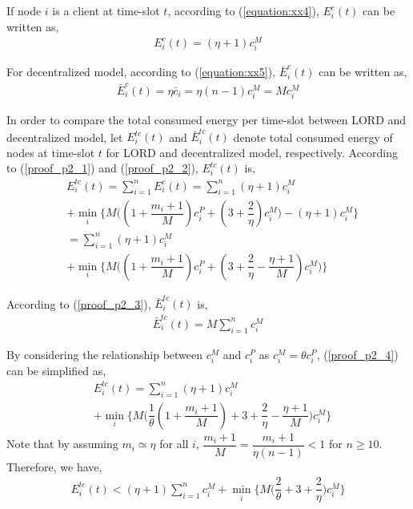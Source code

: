 \documentclass[journal,12pt, onecolumn]{IEEEtran}
\begin{document}
If node $i$ is a client at time-slot $t$, according to (\ref{equation:xx4}), $E_i^c(t)$ can be written as,
\begin{align}
\label{proof_p2_2}
 E_i^c(t)= (\eta +1)c_i^M
 \end{align}
 
For decentralized model, according to (\ref{equation:xx5}), $\bar{E}_i^c(t)$ can be written as,
\begin{align}
\label{proof_p2_3}
\bar{E}_i^c(t)= \eta\bar{c}_i = \eta (n-1)c_i^M = M c_i^M
 \end{align}
 
In order to compare the total consumed energy per time-slot between LORD and decentralized model, let $E_i^{tc}(t)$ and $\bar{E}_i^{tc}(t)$ denote total consumed energy of nodes at time-slot $t$ for LORD and decentralized model, respectively. According to (\ref{proof_p2_1}) and (\ref{proof_p2_2}), $E_i^{tc}(t)$ is,
\begin{align}
\label{proof_p2_4}
 &E_i^{tc}(t)= \sum_{i=1}^n E_i^c (t) = \sum_{i=1}^n (\eta +1)c_i^M \nonumber
 \\
 & + 
 \min_i \Big\{   M \Big( (1 + \dfrac{m_i +1}{M})c_i ^{P} + (3+\dfrac{2}{\eta})c_i ^{M}  \Big)  - (\eta +1)c_i^M \Big\}
 \nonumber \\
 & = 
 \sum_{i=1}^n (\eta +1)c_i^M 
 \nonumber \\
& + 
 \min_i \Big\{   M \Big( (1 + \dfrac{m_i +1}{M})c_i ^{P} + (3+\dfrac{2}{\eta} - \dfrac{\eta +1}{M})c_i ^{M}  \Big) \Big\} 
 \end{align}

According to (\ref{proof_p2_3}), $\bar{E}_i^{tc}(t)$ is, 
\begin{align}
\label{proof_p2_5}
\bar{E}_i^{tc}(t)= M \sum_{i=1}^n c_i^M
 \end{align}

By considering the relationship between $c_i^M$ and $c_i^P$ as $c_i^M = \theta c_i^P$, (\ref{proof_p2_4}) can be simplified as, 
 \begin{align}
\label{proof_p2_6}
 &E_i^{tc}(t)= 
 \sum_{i=1}^n (\eta +1)c_i^M 
 \nonumber \\
& + 
 \min_i \Big\{   M \Big( \dfrac{1}{\theta}(1 + \dfrac{m_i +1}{M}) + 3+\dfrac{2}{\eta} - \dfrac{\eta +1}{M} \Big)c_i ^{M}  \Big\} 
 \end{align}
Note that by assuming $m_i \simeq \eta$ for all $i$, $\dfrac{m_i +1}{M} = \dfrac{m_i +1}{\eta(n-1)} <1$ for $n\geq10$. Therefore, we have,
 \begin{align}
\label{proof_p2_7}
E_i^{tc}(t) <
(\eta +1) \sum_{i=1}^n c_i^M  + 
 \min_i \Big\{   M \Big( \dfrac{2}{\theta} + 3+\dfrac{2}{\eta} \Big)c_i ^{M}  \Big\} 
 \end{align}
 
\end{document}
